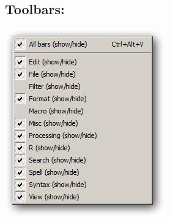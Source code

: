\hypertarget{menu_view_toolbars}{}
\subsection{Toolbars:}

\includegraphics[scale=0.50]{./res/menu_view_toolsbar.png}\\

